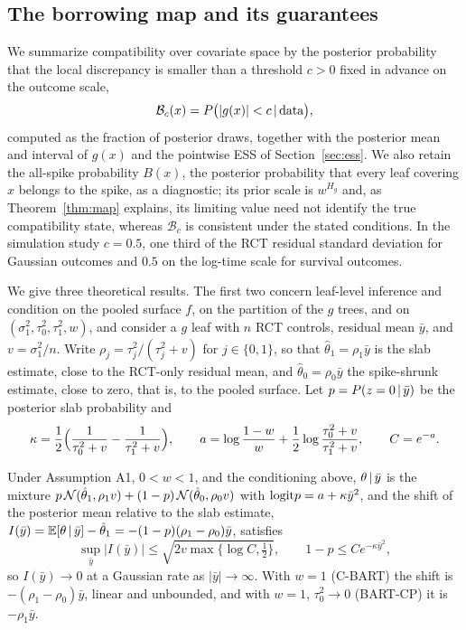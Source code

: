 \subsection{The borrowing map and its guarantees}
\label{sec:map}

We summarize compatibility over covariate space by the posterior probability that the local discrepancy is smaller than a threshold $c>0$ fixed in advance on the outcome scale,
\begin{equation}
\mathcal B_c(x)=P\bigl(|g(x)|<c\,\vert\,\text{data}\bigr),
\label{eq:map}
\end{equation}
computed as the fraction of posterior draws, together with the posterior mean and interval of $g(x)$ and the pointwise ESS of Section~\ref{sec:ess}. We also retain the all-spike probability $B(x)$, the posterior probability that every leaf covering $x$ belongs to the spike, as a diagnostic; its prior scale is $w^{H_g}$ and, as Theorem~\ref{thm:map} explains, its limiting value need not identify the true compatibility state, whereas $\mathcal B_c$ is consistent under the stated conditions. In the simulation study $c=0.5$, one third of the RCT residual standard deviation for Gaussian outcomes and $0.5$ on the log-time scale for survival outcomes.

We give three theoretical results. The first two concern leaf-level inference and condition on the pooled surface $f$, on the partition of the $g$ trees, and on $(\sigma_1^2,\tau_0^2,\tau_1^2,w)$, and consider a $g$ leaf with $n$ RCT controls, residual mean $\bar y$, and $v=\sigma_1^2/n$. Write $\rho_j=\tau_j^2/(\tau_j^2+v)$ for $j\in\{0,1\}$, so that $\hat\theta_1=\rho_1\bar y$ is the slab estimate, close to the RCT-only residual mean, and $\hat\theta_0=\rho_0\bar y$ the spike-shrunk estimate, close to zero, that is, to the pooled surface. Let $p=P(z=0\,\vert\,\bar y)$ be the posterior slab probability and
\begin{equation}
\kappa=\frac12\Bigl(\frac1{\tau_0^2+v}-\frac1{\tau_1^2+v}\Bigr),\qquad
a=\log\frac{1-w}{w}+\frac12\log\frac{\tau_0^2+v}{\tau_1^2+v},\qquad C=e^{-a}.
\label{eq:kappa}
\end{equation}

\begin{theorem}\label{thm:influence}
Under Assumption A1, $0<w<1$, and the conditioning above, $\theta\,\vert\,\bar y$ is the mixture $p\,\mathcal{N}(\hat\theta_1,\rho_1v)+(1-p)\,\mathcal{N}(\hat\theta_0,\rho_0v)$ with $\mathrm{logit} p=a+\kappa\bar y^2$, and the shift of the posterior mean relative to the slab estimate, $I(\bar y)=\mathbb{E}[\theta\,\vert\,\bar y]-\hat\theta_1=-(1-p)(\rho_1-\rho_0)\bar y$, satisfies
\[
\sup_{\bar y}|I(\bar y)|\le\sqrt{2v\max\{\log C,\tfrac12\}},\qquad 1-p\le Ce^{-\kappa\bar y^2},
\]
so $I(\bar y)\to0$ at a Gaussian rate as $|\bar y|\to\infty$. With $w=1$ (C-BART) the shift is $-(\rho_1-\rho_0)\bar y$, linear and unbounded, and with $w=1$, $\tau_0^2\to0$ (BART-CP) it is $-\rho_1\bar y$.
\end{theorem}

